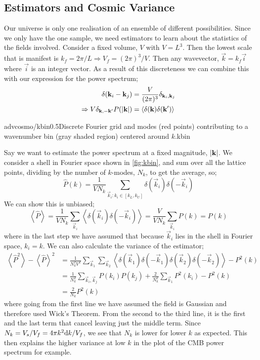 \subsection{Estimators and Cosmic Variance}
Our universe is only one realisation of an ensemble of different possibilities. Since we only have the one sample, we need estimators to learn about the statistics of the fields involved. Consider a fixed volume, $V$ with $V = L^3$. Then the lowest scale that is manifest is $k_f = 2\pi / L \Rightarrow V_f = (2\pi)^3 / V$. Then any wavevector, $\vec k = k_f \vec i$ where $\vec i$ is an integer vector. As a result of this discreteness we can combine this with our expression for the power spectrum;
\begin{align*}
\delta(\vec{k}_i - \vec{k}_j) &= \frac{V}{(2\pi)^3}\delta_{\vec{k}_i, \vec{k}_j} \\
\Rightarrow V \delta _{\vec{k}, -\vec{k}\pr}P\left(\abs{\vec k}\right) &= \left< \delta(\vec k) \delta (\vec{k}\pr) \right>
\end{align*}
\begin{mygraphic}{advcosmo/kbin}{0.5}{Discrete Fourier grid and modes (red points) contributing to a wavenumber bin (gray shaded region) centered around $k$.}{kbin}\end{mygraphic}
Say we want to estimate the power spectrum at a fixed magnitude, $\abs{\vec k}$. We consider a shell in Fourier space shown in \autoref{fig:kbin}, and sum over all the lattice points, dividing by the number of $k$-modes, $N_k$, to get the average, so;
\begin{equation}
\hat{P}(k) = \frac{1}{VN_{k}}\sum_{\vec{k}_i : k_i \in [k_L, k_U]}{\delta(\vec{k}_i)\delta(-\vec{k}_i)}
\end{equation}
We can show this is unbiased;
\begin{equation}
\left< \hat{P} \right> = \frac{1}{VN_k}\sum_{\vec{k}_i}{\left< \delta(\vec{k}_i)\delta(-\vec{k}_i) \right>} = \frac{V}{VN_k}\sum_{\vec{k}_i}{P(k)} = P(k)
\end{equation}
where in the last step we have assumed that because $\vec{k}_i$ lies in the shell in Fourier space, $k_i = k$. We can also calculate the variance of the estimator;
\begin{align}
\left< \hat{P}^2 \right> - \left< \hat{P} \right>^2 &= \frac{1}{N_k^2 V^2}\sum_{\vec{k}_1}{\sum_{\vec{k}_2}{\left< \delta(\vec{k}_1)\delta(-\vec{k}_1)\delta(\vec{k}_2)\delta(-\vec{k}_2) \right>}} - P^2(k) \nonumber \\
&= \frac{1}{N_k^2}\sum_{\vec{k}_i, \vec{k}_j}{P(k_i)P(k_j)} + \frac{2}{N_k^2}\sum_{\vec{k}_1}{P^2(k_i)} - P^2(k)\nonumber \\
&= \frac{2}{N_k}P^2(k)
\end{align}
where going from the first line we have assumed the field is Gaussian and therefore used Wick's Theorem. From the second to the third line, it is the first and the last term that cancel leaving just the middle term. Since $N_k = V_s/V_f = 4\pi k^2 \text{d} k/V_f$, we see that $N_k$ is lower for lower $k$ as expected. This then explains the higher variance at low $k$ in the plot of the CMB power spectrum for example.
